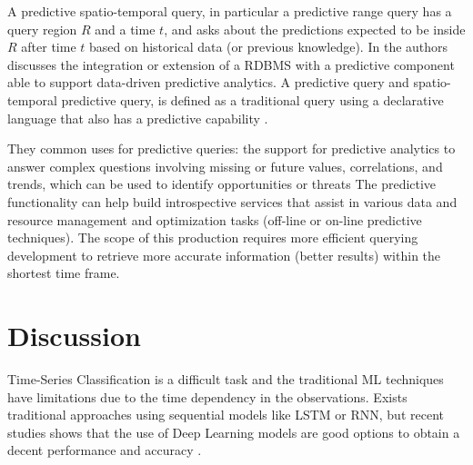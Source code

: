 A predictive spatio-temporal query, in particular a predictive range query has a query region $R$ and a time $t$, and asks about the predictions expected to be inside $R$ after time $t$ based on historical data (or previous knowledge).  In \cite{Akdere2011} the authors discusses the integration or extension of a RDBMS with a predictive component able to support data-driven predictive analytics. A predictive query and spatio-temporal predictive query, is defined as a traditional query using a declarative language that also has a predictive capability \cite{Hendawi2012}. 

They common uses for predictive queries: the support for predictive analytics to answer complex questions involving missing or future values, correlations, and trends, which  can be used to identify opportunities or threats
The predictive functionality can help build introspective services that assist in various data and resource management and optimization tasks (off-line or on-line predictive techniques). 
The  scope  of  this  production requires  more  efficient  querying development to  retrieve more accurate  information (better results)  within  the  shortest time  frame.


%
%
\section{Discussion}
Time-Series Classification is a difficult task and the traditional ML techniques have limitations due to the time dependency in the observations. Exists traditional approaches using sequential models like LSTM or RNN, but recent studies shows that the use of Deep Learning models are good options to obtain a decent performance and accuracy \cite{Fawaz2019}. 
